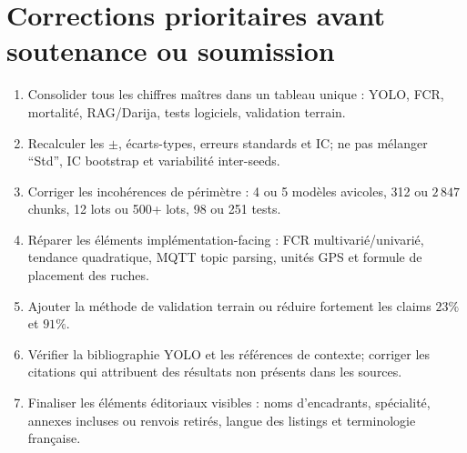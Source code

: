 \documentclass[11pt,a4paper]{article}
\begin{document}
\section*{Corrections prioritaires avant soutenance ou soumission}

\begin{enumerate}
  \item Consolider tous les chiffres maîtres dans un tableau unique : YOLO, FCR, mortalité, RAG/Darija, tests logiciels, validation terrain.
  \item Recalculer les \(\pm\), écarts-types, erreurs standards et IC; ne pas mélanger \enquote{Std}, IC bootstrap et variabilité inter-seeds.
  \item Corriger les incohérences de périmètre : 4 ou 5 modèles avicoles, 312 ou \(2\,847\) chunks, 12 lots ou 500+ lots, 98 ou 251 tests.
  \item Réparer les éléments implémentation-facing : FCR multivarié/univarié, tendance quadratique, MQTT topic parsing, unités GPS et formule de placement des ruches.
  \item Ajouter la méthode de validation terrain ou réduire fortement les claims \(23\%\) et \(91\%\).
  \item Vérifier la bibliographie YOLO et les références de contexte; corriger les citations qui attribuent des résultats non présents dans les sources.
  \item Finaliser les éléments éditoriaux visibles : noms d'encadrants, spécialité, annexes incluses ou renvois retirés, langue des listings et terminologie française.
\end{enumerate}
\end{document}
